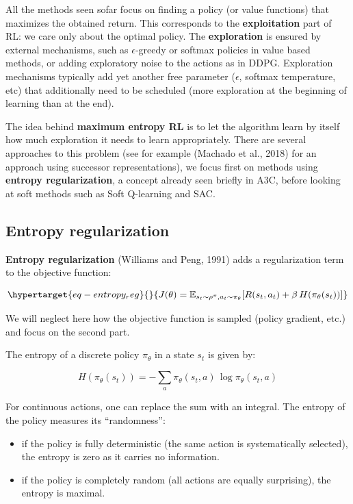 \documentclass[
  letterpaper,
  DIV=11,
  numbers=noendperiod]{scrreprt}
\providecommand{\tightlist}{%
  \setlength{\itemsep}{0pt}\setlength{\parskip}{0pt}}\usepackage{longtable,booktabs,array}
\begin{document}
All the methods seen sofar focus on finding a policy (or value
functions) that maximizes the obtained return. This corresponds to the
\textbf{exploitation} part of RL: we care only about the optimal policy.
The \textbf{exploration} is ensured by external mechanisms, such as
\(\epsilon\)-greedy or softmax policies in value based methods, or
adding exploratory noise to the actions as in DDPG. Exploration
mechanisms typically add yet another free parameter (\(\epsilon\),
softmax temperature, etc) that additionally need to be scheduled (more
exploration at the beginning of learning than at the end).

The idea behind \textbf{maximum entropy RL} is to let the algorithm
learn by itself how much exploration it needs to learn appropriately.
There are several approaches to this problem (see for example (Machado
et al., 2018) for an approach using successor representations), we focus
first on methods using \textbf{entropy regularization}, a concept
already seen briefly in A3C, before looking at soft methods such as Soft
Q-learning and SAC.

\hypertarget{entropy-regularization-1}{%
\subsection{Entropy regularization}\label{entropy-regularization-1}}

\textbf{Entropy regularization} (Williams and Peng, 1991) adds a
regularization term to the objective function:

\begin{equation}\protect\hypertarget{eq-entropy_reg}{}{
    J(\theta) =  \mathbb{E}_{s_t \sim \rho^\pi, a_t \sim \pi_\theta}[ R(s_t, a_t) + \beta \,  H(\pi_\theta(s_t))]
}\label{eq-entropy_reg}\end{equation}

We will neglect here how the objective function is sampled (policy
gradient, etc.) and focus on the second part.

The entropy of a discrete policy \(\pi_\theta\) in a state \(s_t\) is
given by:

\[
    H(\pi_\theta(s_t)) = - \sum_a \pi_\theta(s_t, a) \, \log \pi_\theta(s_t, a)
\]

For continuous actions, one can replace the sum with an integral. The
entropy of the policy measures its ``randomness'':

\begin{itemize}
\tightlist
\item
  if the policy is fully deterministic (the same action is
  systematically selected), the entropy is zero as it carries no
  information.
\item
  if the policy is completely random (all actions are equally
  surprising), the entropy is maximal.
\end{itemize}
\end{document}
